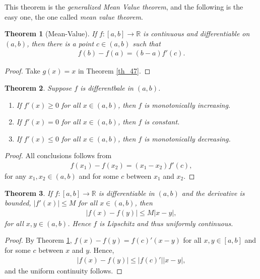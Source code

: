 \documentclass[11pt]{book}
\newtheorem{theorem}{Theorem}[chapter]
\theoremstyle{definition}
\numberwithin{equation}{chapter}
\begin{document}
\medskip

This theorem is the {\em generalized Mean Value theorem}, and the following is the easy one, the one called {\em mean value theorem}.

\medskip

\begin{theorem}[Mean-Value]\label{th_48}
If $f: [a,b] \to \mathbb{R}$ is continuous and differentiable on $(a,b)$, then there is a point $c \in (a,b)$ such that
\begin{align*}
    f(b) - f(a) = (b - a) f'(c).
\end{align*}
\end{theorem}
\begin{proof}
Take $g(x) = x$ in Theorem \ref{th_47}.
\end{proof}

\medskip

\begin{theorem}
Suppose $f$ is differentbale in $(a,b)$.
\begin{enumerate}[label=(\alph*)]
    \item If $f'(x) \geq 0$ for all $x \in (a,b)$, then $f$ is monotonically increasing.
    
    \item If $f'(x) = 0$ for all $x \in (a,b)$, then $f$ is constant.
    
    \item If $f'(x) \leq 0$ for all $x \in (a,b)$, then $f$ is monotonically decreasing.
\end{enumerate}
\end{theorem}
\begin{proof}
All conclusions follows from
\begin{align*}
    f(x_1) - f(x_2) = (x_1 - x_2) f'(c),
\end{align*}
for any $x_1, x_2 \in (a,b)$ and for some $c$ between $x_1$ and $x_2$.
\end{proof}

\medskip

\begin{theorem}
If $f: [a,b] \to \mathbb{R}$ is differentiable in $(a,b)$ and the derivative is bounded, $\left|f'(x)\right| \leq M$ for all $x \in (a,b)$, then 
\begin{align*}
    \left|f(x) - f(y)\right| \leq M \left|x - y\right|,
\end{align*}
for all $x,y \in (a,b)$. Hence $f$ is Lipschitz and thus uniformly continuous.
\end{theorem}
\begin{proof}
By Theorem \ref{th_48}, $f(x) - f(y) = f(c)'(x - y)$ for all $x,y \in [a,b]$ and for some $c$ between $x$ and $y$. Hence,
\begin{align*}
    \left|f(x) - f(y)\right| \leq \left|f(c)'\right| \left|x - y\right|,
\end{align*}
and the uniform continuity follows.
\end{proof}
\end{document}
